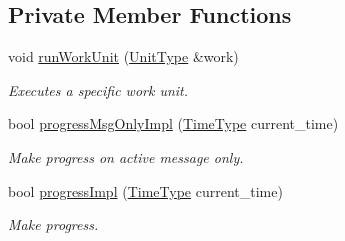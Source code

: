 \subsection*{Private Member Functions}
\begin{DoxyCompactItemize}
\item 
void \hyperlink{structvt_1_1sched_1_1_scheduler_ac4d5c3a4baf7a6cb6bdc2e8dc1a3af91}{run\+Work\+Unit} (\hyperlink{structvt_1_1sched_1_1_scheduler_a398229f29b0940cea85aba4bae78b0be}{Unit\+Type} \&work)
\begin{DoxyCompactList}\small\item\em Executes a specific work unit. \end{DoxyCompactList}\item 
bool \hyperlink{structvt_1_1sched_1_1_scheduler_a24bc155e1e860c1c7723373128dfd90c}{progress\+Msg\+Only\+Impl} (\hyperlink{namespacevt_a876a9d0cd5a952859c72de8a46881442}{Time\+Type} current\+\_\+time)
\begin{DoxyCompactList}\small\item\em Make progress on active message only. \end{DoxyCompactList}\item 
bool \hyperlink{structvt_1_1sched_1_1_scheduler_a29bba6f371736bcfaf542c7d6f46ad30}{progress\+Impl} (\hyperlink{namespacevt_a876a9d0cd5a952859c72de8a46881442}{Time\+Type} current\+\_\+time)
\begin{DoxyCompactList}\small\item\em Make progress. \end{DoxyCompactList}\end{DoxyCompactItemize}
